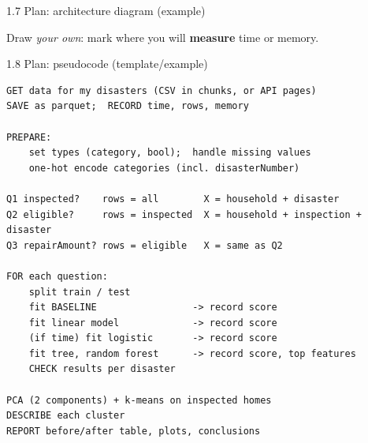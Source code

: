 \documentclass[aspectratio=43,11pt]{beamer}
\begin{document}
\begin{frame}{1.7 Plan: architecture diagram (example)}
  \centering
  \par
  \vspace{0.8em}
  \raggedright
  \small Draw \emph{your own}: mark where you will \textbf{measure} time or memory.
\end{frame}

\begin{frame}[fragile]{1.8 Plan: pseudocode (template/example)}
\begin{lstlisting}
GET data for my disasters (CSV in chunks, or API pages)
SAVE as parquet;  RECORD time, rows, memory

PREPARE:
    set types (category, bool);  handle missing values
    one-hot encode categories (incl. disasterNumber)

Q1 inspected?    rows = all        X = household + disaster
Q2 eligible?     rows = inspected  X = household + inspection + disaster
Q3 repairAmount? rows = eligible   X = same as Q2

FOR each question:
    split train / test
    fit BASELINE                 -> record score
    fit linear model             -> record score
    (if time) fit logistic       -> record score
    fit tree, random forest      -> record score, top features
    CHECK results per disaster

PCA (2 components) + k-means on inspected homes
DESCRIBE each cluster
REPORT before/after table, plots, conclusions
\end{lstlisting}
\end{frame}
\end{document}
